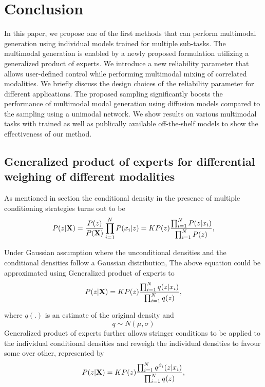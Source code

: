 \documentclass[10pt,twocolumn,letterpaper]{article}
\begin{document}
\section{Conclusion}

In this paper, we propose one of the first methods that can perform multimodal generation using individual models trained for multiple sub-tasks. The multimodal generation is enabled by a newly proposed formulation utilizing a generalized product of experts. We introduce a new reliability parameter that allows user-defined control while performing multimodal mixing of correlated modalities. We briefly discuss the design choices of the reliability parameter for different applications. The proposed sampling significantly boosts the performance of multimodal modal generation using diffusion models  compared to the sampling using a unimodal network. We show results on various multimodal tasks with trained as well as publically available off-the-shelf models to show the effectiveness of our method.
{\small


}
\newpage

\subsection{Generalized product of experts for differential weighing of different modalities}


As mentioned in section the conditional density in the presence of multiple conditioning strategies turns out to be
\begin{multline}
    P(z|{\bf{X}})=\frac{P(z)}{P({\bf{X}})}\prod_{i=1}^{N}P(x_i|z) 
    = KP(z) \frac{\prod_{i=1}^{N}P(z|x_i)}{\prod_{i=1}^{N}P(z)},
    \label{eq:POE5}
\end{multline}

Under Gaussian assumption where the unconditional densities and the conditional densities follow a Gaussian distribution, The above equation could be approximated using Generalized product of experts\cite{cao2014generalized} to
\begin{equation}
    P(z|{\bf{X}})
    = KP(z) \frac{\prod_{i=1}^{N}q(z|x_i)}{\prod_{i=1}^{N}q(z)},
    \label{eq:POE2}
\end{equation}

where $q(.)$ is an estimate of the original density and 
\begin{equation}
    q \sim N(\mu, \sigma)
\end{equation}
Generalized product of experts\cite{cao2014generalized} further allows stringer conditions to be applied to the individual conditional densities and reweigh the individual densities to favour some over other, represented by
\begin{equation}
    P(z|{\bf{X}})
    = KP(z) \frac{\prod_{i=1}^{N}q^{\beta_i}(z|x_i)}{\prod_{i=1}^{N}q(z)},
    \label{eq:POE3}
\end{equation}
\end{document}

